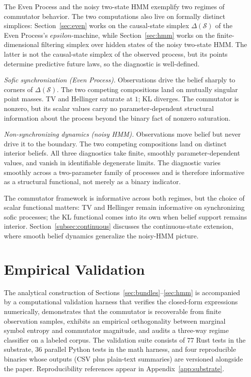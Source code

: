 \documentclass[11pt,a4paper]{article}
\def\varepsilon{epsilon}%
\theoremstyle{plain}
\theoremstyle{definition}
\theoremstyle{remark}
\newcommand{\States}{\mathcal{S}}
\begin{document}
The Even Process and the noisy two-state HMM exemplify two regimes of commutator behavior. The two computations also live on formally distinct simplices: Section~\ref{sec:even} works on the causal-state simplex $\Delta(\States)$ of the Even Process's $\varepsilon$-machine, while Section~\ref{sec:hmm} works on the finite-dimensional filtering simplex over hidden states of the noisy two-state HMM. The latter is not the causal-state simplex of the observed process, but its points determine predictive future laws, so the diagnostic is well-defined.

\emph{Sofic synchronization (Even Process).} Observations drive the belief sharply to corners of $\Delta(\States)$. The two competing compositions land on mutually singular point masses. TV and Hellinger saturate at $1$; KL diverges. The commutator is nonzero, but its scalar values carry no parameter-dependent structural information about the process beyond the binary fact of nonzero saturation.

\emph{Non-synchronizing dynamics (noisy HMM).} Observations move belief but never drive it to the boundary. The two competing compositions land on distinct interior beliefs. All three diagnostics take finite, smoothly parameter-dependent values, and vanish in identifiable degenerate limits. The diagnostic varies smoothly across a two-parameter family of processes and is therefore informative as a structural functional, not merely as a binary indicator.

The commutator framework is informative across both regimes, but the choice of scalar functional matters: TV and Hellinger remain informative on synchronizing sofic processes; the KL functional comes into its own when belief support remains interior. Section~\ref{subsec:continuous} discusses the continuous-state extension, where smooth belief dynamics generalize the noisy-HMM picture.

\section{Empirical Validation}
\label{sec:empirical}

The analytical construction of Sections~\ref{sec:bundles}--\ref{sec:hmm} is accompanied by a computational validation harness that verifies the closed-form expressions numerically, demonstrates that the commutator is recoverable from finite observation samples, exhibits an empirical orthogonality between marginal symbol entropy and commutator magnitude, and audits a three-way regime classifier on a labeled corpus. The validation suite consists of 77 Rust tests in the substrate, 36 parallel Python tests in the math harness, and four reproducible binaries whose outputs (CSV plus plain-text summaries) are versioned alongside the paper. Reproducibility references appear in Appendix~\ref{app:substrate}.
\end{document}
